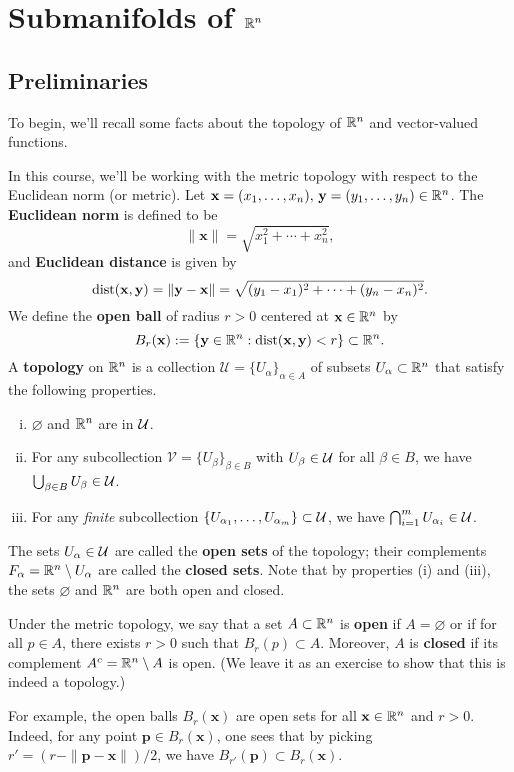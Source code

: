 \section{Submanifolds of $\mathbb{R}^n$}\label{sec:1}

\subsection{Preliminaries}\label{subsec:1.1}
To begin, we'll recall some facts about the topology of $\mathbb{R}^n$ and 
vector-valued functions. 

In this course, we'll be working with the metric topology with respect 
to the Euclidean norm (or metric). Let $\mathbf{x} = (x_1, \dots, x_n),\,
\mathbf{y} = (y_1, \dots, y_n) \in \mathbb{R}^n$.
The {\bf Euclidean norm} is defined to be 
\[ \|\mathbf x\| = \sqrt{x_1^2 + \cdots + x_n^2}, \] 
and {\bf Euclidean distance} is given by 
\[ \operatorname{dist}(\mathbf x, \mathbf y) = \|\mathbf y - \mathbf x\| = \sqrt{(y_1 - x_1)^2 + 
\cdots + (y_n - x_n)^2}. \] 
We define the {\bf open ball} of radius $r > 0$ centered at $\mathbf x \in \mathbb{R}^n$ by 
\[ B_r(\mathbf x) := \{\mathbf y \in \mathbb{R}^n : \operatorname{dist}(\mathbf x, \mathbf y) < r\} \subset \mathbb{R}^n. \] 
A {\bf topology} on $\mathbb{R}^n$ is a collection $\mathcal{U} = \{U_\alpha\}_{\alpha \in A}$ 
of subsets $U_\alpha \subset \mathbb{R}^n$ that satisfy the following properties.
\begin{enumerate}[(i)]
    \item $\varnothing$ and $\mathbb{R}^n$ are in ${\cal U}$. 
    \item For any subcollection $\mathcal{V} = \{U_\beta\}_{\beta \in B}$ 
    with $U_\beta \in {\cal U}$ for all $\beta \in B$, we have 
    $\bigcup_{\beta \in B} U_\beta \in {\cal U}$. 
    \item For any \emph{finite} subcollection $\{U_{\alpha_1}, \dots, 
    U_{\alpha_m}\} \subset {\cal U}$, we have $\bigcap_{i=1}^m 
    U_{\alpha_i} \in {\cal U}$. 
\end{enumerate}
The sets $U_\alpha \in {\cal U}$ are called the {\bf open sets} of the topology; 
their complements $F_\alpha = \mathbb{R}^n \setminus U_\alpha$ are called the 
{\bf closed sets}. Note that by properties (i) and (iii), the sets 
$\varnothing$ and $\mathbb{R}^n$ are both open and closed. 

Under the metric topology, we say that a set $A \subset \mathbb{R}^n$ is {\bf open} 
if $A = \varnothing$ or if for all $p \in A$, there exists $r > 0$ 
such that $B_r(p) \subset A$. Moreover, $A$ is {\bf closed} if its 
complement $A^c = \mathbb{R}^n \setminus A$ is open. (We leave it as an 
exercise to show that this is indeed a topology.)

For example, the open balls $B_r(\mathbf x)$ are open sets for all 
$\mathbf x \in \mathbb{R}^n$ and $r > 0$. Indeed, for any point $\mathbf p \in 
B_r(\mathbf x)$, one sees that by picking $r' = (r - \|\mathbf p - 
\mathbf x\|)/2$, we have $B_{r'}(\mathbf p) \subset B_r(\mathbf x)$. 
